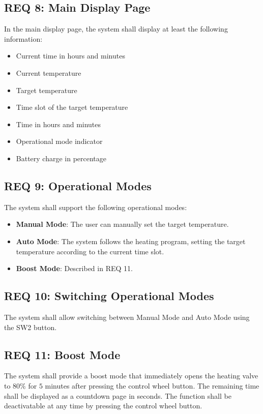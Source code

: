 \subsection*{REQ 8: Main Display Page}
\label{subsec:REQ 8: Main Display Page}
In the main display page, the system shall display at least the following information:
\begin{itemize}
    \item Current time in hours and minutes
    \item Current temperature
    \item Target temperature
    \item Time slot of the target temperature
    \item Time in hours and minutes
    \item Operational mode indicator
    \item Battery charge in percentage
\end{itemize}

\subsection*{REQ 9: Operational Modes}
\label{subsec:REQ 9: Operational Modes}
The system shall support the following operational modes:
\begin{itemize}
    \item \textbf{Manual Mode}: The user can manually set the target temperature.
    \item \textbf{Auto Mode}: The system follows the heating program, setting the target temperature according to the current time slot.
    \item \textbf{Boost Mode}: Described in REQ 11.
\end{itemize}

\subsection*{REQ 10: Switching Operational Modes}
\label{subsec:REQ 10: Switching Operational Modes}
The system shall allow switching between Manual Mode and Auto Mode using the SW2 button.

\subsection*{REQ 11: Boost Mode}
\label{subsec:REQ 11: Boost Mode}
The system shall provide a boost mode that immediately opens the heating valve to $80\%$ for $5$ minutes after pressing the control wheel button. The remaining time shall be displayed as a countdown page in seconds. The function shall be deactivatable at any time by pressing the control wheel button.

